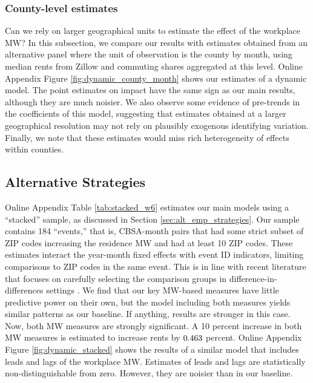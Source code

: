 \subsubsection{County-level estimates}

Can we rely on larger geographical units to estimate the effect of the 
workplace MW?
In this subsection, we compare our results with estimates obtained from an
alternative panel where the unit of observation is the county by month, using
median rents from Zillow and commuting shares aggregated at this level.
Online Appendix Figure \ref{fig:dynamic_county_month} shows our estimates 
of a dynamic model.
The point estimates on impact have the same sign as our main results,
although they are much noisier.
We also observe some evidence of pre-trends in the coefficients of this 
model, suggesting that estimates obtained at a larger geographical 
resolution may not rely on plausibly exogenous identifying variation.
Finally, we note that these estimates would miss rich heterogeneity of 
effects within counties.

\subsection{Alternative Strategies}
\label{sec:results_alternative_strategies}

Online Appendix Table \ref{tab:stacked_w6} estimates our main models using a 
``stacked'' sample, as discussed in Section \ref{sec:alt_emp_strategies}.
Our sample contains 184 ``events,'' that is, CBSA-month pairs that had some 
strict subset of ZIP codes increasing the residence MW and had at least 10
ZIP codes.
These estimates interact the year-month fixed effects with event ID indicators, 
limiting comparisons to ZIP codes in the same event.
This is in line with recent literature that focuses on carefully selecting the 
comparison groups in difference-in-differences settings
\parencite{deChaisemartinEtAl2022, RothEtAl2022}.
We find that our key MW-based measures have little predictive power on their own,
but the model including both measures yields similar patterns as our baseline.
If anything, results are stronger in this case.
Now, both MW measures are strongly significant.
A 10 percent increase in both MW measures is estimated to increase rents 
by $\textnormal{0.463}$ percent.
Online Appendix Figure \ref{fig:dynamic_stacked} shows the results of a similar 
model that includes leads and lags of the workplace MW.
Estimates of leads and lags are statistically non-distinguishable from zero.
However, they are noisier than in our baseline.


